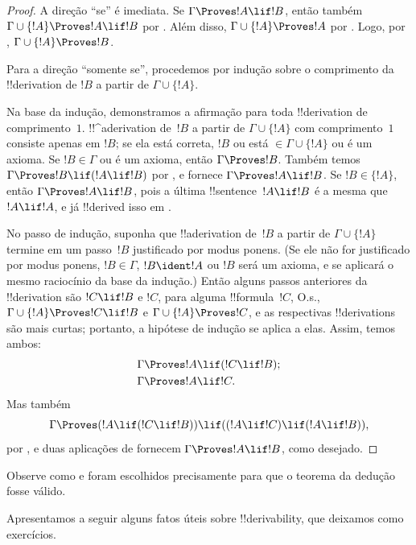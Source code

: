\documentclass[../../../include/open-logic-section]{subfiles}
\begin{document}
\begin{proof}
A direção ``se'' é imediata. Se $\Gamma \Proves !A \lif !B$, então
também $\Gamma \cup \{!A\} \Proves !A \lif !B$ por
. Além disso,
$\Gamma \cup \{!A\} \Proves !A$ por .
Logo, por , $\Gamma \cup \{!A\} \Proves !B$.

Para a direção ``somente se'', procedemos por indução sobre o
comprimento da !!{derivation} de $!B$ a partir de
$\Gamma \cup \{!A\}$.

Na base da indução, demonstramos a afirmação para toda !!{derivation} de
comprimento~$1$. !!^a{derivation} de~$!B$ a partir de
$\Gamma \cup \{!A\}$ com comprimento~$1$ consiste apenas em $!B$; se
ela está correta, $!B$ ou está $\in \Gamma \cup \{!A\}$ ou é um axioma.
Se $!B \in \Gamma$ ou é um axioma, então $\Gamma \Proves !B$. Também
temos $\Gamma \Proves !B \lif (!A \lif !B)$ por
, e  fornece
$\Gamma \Proves !A \lif !B$. Se $!B \in \{ !A\}$, então
$\Gamma \Proves !A \lif !B$, pois a última !!{sentence}~$!A \lif !B$ é
a mesma que $!A \lif !A$, e já !!{derive}d isso em
.

No passo de indução, suponha que !!a{derivation} de~$!B$ a partir de
$\Gamma \cup \{!A\}$ termine em um passo~$!B$ justificado por modus
ponens. (Se ele não for justificado por modus ponens, $!B \in \Gamma$,
$!B \ident !A$ ou $!B$ será um axioma, e se aplicará o mesmo raciocínio
da base da indução.) Então alguns passos anteriores da !!{derivation}
são $!C \lif !B$ e $!C$, para alguma !!{formula}~$!C$, O.s.\@,
$\Gamma \cup \{!A\} \Proves !C \lif !B$ e $\Gamma \cup \{!A\}
\Proves !C$, e as respectivas !!{derivation}s são mais curtas; portanto,
a hipótese de indução se aplica a elas. Assim, temos ambos:
\begin{align*}
  & \Gamma \Proves !A \lif (!C \lif !B); \\
  & \Gamma \Proves !A \lif !C.
\end{align*}
Mas também
\[
\Gamma \Proves (!A \lif (!C \lif !B)) \lif
((!A\lif !C)  \lif (!A \lif !B)),
\]
por , e duas aplicações de  fornecem
$\Gamma \Proves !A \lif !B$, como desejado.
\end{proof}

Observe como  e  foram escolhidos
precisamente para que o teorema da dedução fosse válido.

Apresentamos a seguir alguns fatos úteis sobre !!{derivability}, que
deixamos como exercícios.
\end{document}
